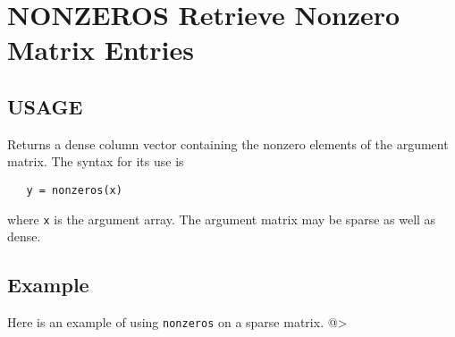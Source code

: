 \section{NONZEROS Retrieve Nonzero Matrix Entries}

\subsection{USAGE}

Returns a dense column vector containing the nonzero elements
of the argument matrix.  The syntax for its use is
\begin{verbatim}
   y = nonzeros(x)
\end{verbatim}
where \verb|x| is the argument array.  The argument matrix may
be sparse as well as dense.
\subsection{Example}

Here is an example of using \verb|nonzeros| on a sparse matrix.
@>
